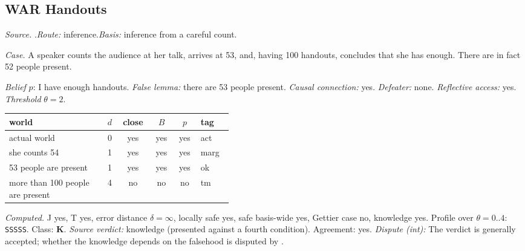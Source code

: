 \subsection*{WAR \enspace Handouts}
\noindent\textit{Source.} \citet{Warfield2005}.\quad \textit{Route:} inference.\quad \textit{Basis:} inference from a careful count.\par
\noindent\textit{Case.} A speaker counts the audience at her talk, arrives at 53, and, having 100 handouts, concludes that she has enough. There are in fact 52 people present.\par
\noindent\textit{Belief} $p$: I have enough handouts.
 \textit{False lemma:} there are 53 people present. \textit{Causal connection:} yes. \textit{Defeater:} none. \textit{Reflective access:} yes. \textit{Threshold} $\theta = 2$.\par
\begin{center}\begin{tabular}{@{}p{0.43\linewidth}rcccl@{}}
world & $d$ & close & $B$ & $p$ & tag \\ \midrule
actual world & 0 & yes & yes & yes & act \\
she counts 54 & 1 & yes & yes & yes & marg \\
53 people are present & 1 & yes & yes & yes & ok \\
more than 100 people are present & 4 & no & no & no & tm \\
\end{tabular}\end{center}
\noindent\textit{Computed.} J yes, T yes, error distance $\delta = \infty$, locally safe yes, safe basis-wide yes, Gettier case no, knowledge yes. Profile over $\theta = 0..4$: \texttt{SSSSS}. Class: \textbf{K}.
 \textit{Source verdict:} knowledge (presented against a fourth condition). Agreement: yes.
 \textit{Dispute (int):} The verdict is generally accepted; whether the knowledge depends on the falsehood is disputed by \citet{Klein2008}.
\par\medskip
{}
